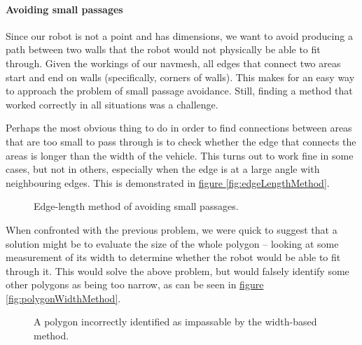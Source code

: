 \documentclass[10pt, abstracton, twocolumn]{scrartcl}
\newcommand{\fref}[1]{\hyperref[#1]{figure \vref{#1}}}
\begin{document}
\paragraph{Avoiding small passages}
Since our robot is not a point and has dimensions, we want to avoid producing a path between two walls that the robot would not physically be able to fit through. Given the workings of our navmesh, all edges that connect two areas start and end on walls (specifically, corners of walls). This makes for an easy way to approach the problem of small passage avoidance. Still, finding a method that worked correctly in all situations was a challenge.

Perhaps the most obvious thing to do in order to find connections between areas that are too small to pass through is to check whether the edge that connects the areas is longer than the width of the vehicle. This turns out to work fine in some cases, but not in others, especially when the edge is at a large angle with neighbouring edges. This is demonstrated in \fref{fig:edgeLengthMethod}.

\begin{figure}[h]
        \centering
        \begin{subfigure}[t]{0.45\columnwidth}
        \centering
        
        \end{subfigure}
        \begin{subfigure}[t]{0.45\columnwidth}
        \centering
        
        \end{subfigure}
        \caption{\small Edge-length method of avoiding small passages.}
        \label{fig:edgeLengthMethod}
\end{figure}

When confronted with the previous problem, we were quick to suggest that a solution might be to evaluate the size of the whole polygon -- looking at some measurement of its width to determine whether the robot would be able to fit through it. This would solve the above problem, but would falsely identify some other polygons as being too narrow, as can be seen in \fref{fig:polygonWidthMethod}.

\begin{figure}[h]
        \centering
        
        \caption{\small A polygon incorrectly identified as impassable by the width-based method.}
        \label{fig:polygonWidthMethod}
\end{figure}
\end{document}
